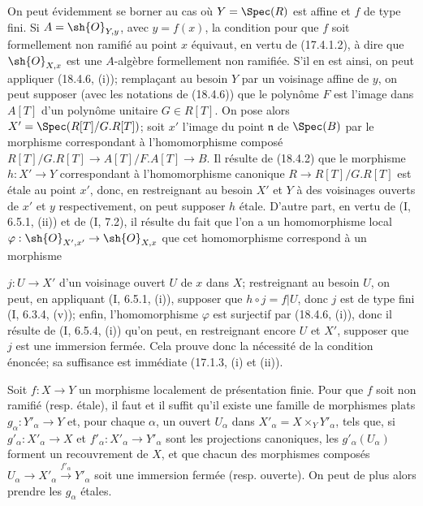 On peut évidemment se borner au cas où $Y=\Spec(R)$ est affine et $f$ de type fini. Si $A=\sh{O}_{Y,y}$, avec $y=f(x)$, la condition pour que $f$ soit formellement non ramifié au point $x$ équivaut, en vertu de (17.4.1.2), à dire que $\sh{O}_{X,x}$ est une $A$-algèbre formellement non ramifiée. S'il en est ainsi, on peut appliquer (18.4.6, (i)); remplaçant au besoin $Y$ par un voisinage affine de $y$, on peut supposer (avec les notations de (18.4.6)) que le polynôme $F$ est l'image dans $A[T]$ d'un polynôme unitaire $G\in R[T]$. On pose alors $X'=\Spec(R[T]/G.R[T])$; soit $x'$ l'image du point $\mathfrak n$ de $\Spec(B)$ par le morphisme correspondant à l'homomorphisme composé $R[T]/G.R[T]\to A[T]/F.A[T]\to B$. Il résulte de (18.4.2) que le morphisme $h:X'\to Y$ correspondant à l'homomorphisme canonique $R\to R[T]/G.R[T]$ est étale au point $x'$, donc, en restreignant au besoin $X'$ et $Y$ à des voisinages ouverts de $x'$ et $y$ respectivement, on peut supposer $h$ étale. D'autre part, en vertu de (I, 6.5.1, (ii)) et de (I, 7.2), il résulte du fait que l'on a un homomorphisme local $\varphi:\sh{O}_{X',x'}\to\sh{O}_{X,x}$ que cet homomorphisme correspond à un morphisme


$j:U\to X'$ d'un voisinage ouvert $U$ de $x$ dans $X$; restreignant au besoin $U$, on peut, en appliquant (I, 6.5.1, (i)), supposer que $h\circ j=f|U$, donc $j$ est de type fini (I, 6.3.4, (v)); enfin, l'homomorphisme $\varphi$ est surjectif par (18.4.6, (i)), donc il résulte de (I, 6.5.4, (i)) qu'on peut, en restreignant encore $U$ et $X'$, supposer que $j$ est une immersion fermée. Cela prouve donc la nécessité de la condition énoncée; sa suffisance est immédiate (17.1.3, (i) et (ii)).

\begin{corollary}[18.4.8]
\label{IV.18.4.8}
Soit $f:X\to Y$ un morphisme localement de présentation finie. Pour que $f$ soit non ramifié (resp. étale), il faut et il suffit qu'il existe une famille de morphismes plats $g_\alpha:Y'_\alpha\to Y$ et, pour chaque $\alpha$, un ouvert $U_\alpha$ dans $X'_\alpha=X\times_Y Y'_\alpha$, tels que, si $g'_\alpha:X'_\alpha\to X$ et $f'_\alpha:X'_\alpha\to Y'_\alpha$ sont les projections canoniques, les $g'_\alpha(U_\alpha)$ forment un recouvrement de $X$, et que chacun des morphismes composés $U_\alpha\to X'_\alpha\xrightarrow{f'_\alpha}Y'_\alpha$ soit une immersion fermée (resp. ouverte). On peut de plus alors prendre les $g_\alpha$ étales.
\end{corollary}

